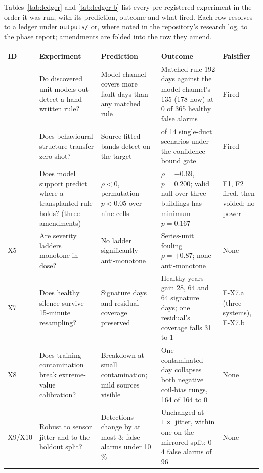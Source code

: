 \documentclass[11pt,letterpaper]{article}
\begin{document}
Tables~\ref{tab:ledger} and \ref{tab:ledger-b} list every pre-registered experiment in the order it was run, with its prediction, outcome and what fired. Each row resolves to a ledger under \texttt{outputs/} or, where noted in the repository's research log, to the phase report; amendments are folded into the row they amend.

\begin{table}[p]
\centering
\footnotesize
\setlength{\tabcolsep}{3pt}
\renewcommand{\arraystretch}{1.05}
\begin{tabular}{@{}>{\raggedright\arraybackslash}p{1.1cm}>{\raggedright\arraybackslash}p{4.6cm}>{\raggedright\arraybackslash}p{3.3cm}>{\raggedright\arraybackslash}p{4.3cm}>{\raggedright\arraybackslash}p{2.2cm}@{}}
\hline
ID & Experiment & Prediction & Outcome & Falsifier \\
\hline
--- & Do discovered unit models out-detect a hand-written rule? & Model channel covers more fault days than any matched rule & Matched rule 192 days against the model channel's 135 (178 now) at 0 of 365 healthy false alarms & Fired \\
--- & Does behavioural structure transfer zero-shot? & Source-fitted bands detect on the target & 0 of 14 single-duct scenarios under the confidence-bound gate & Fired \\
--- & Does model support predict where a transplanted rule holds? (three amendments) & $\rho < 0$, permutation $p < 0.05$ over nine cells & $\rho = -0.69$, $p = 0.200$; valid null over three buildings has minimum $p = 0.167$ & F1, F2 fired, then voided; no power \\
X5 & Are severity ladders monotone in dose? & No ladder significantly anti-monotone & Series-unit fouling $\rho = +0.87$; none anti-monotone & None \\
X7 & Does healthy silence survive 15-minute resampling? & Signature days and residual coverage preserved & Healthy years gain 28, 64 and 64 signature days; one residual's coverage falls 31 to 1 & F-X7.a (three systems), F-X7.b \\
X8 & Does training contamination break extreme-value calibration? & Breakdown at small contamination; mild sources visible & One contaminated day collapses both negative coil-bias rungs, 164 of 164 to 0 & None \\
X9/X10 & Robust to sensor jitter and to the holdout split? & Detections change by at most 3; false alarms under 10\,\% & Unchanged at $1\times$ jitter, within one on the mirrored split; 0--4 false alarms of 96 & None \\

\end{tabular}
\end{table}
\end{document}
